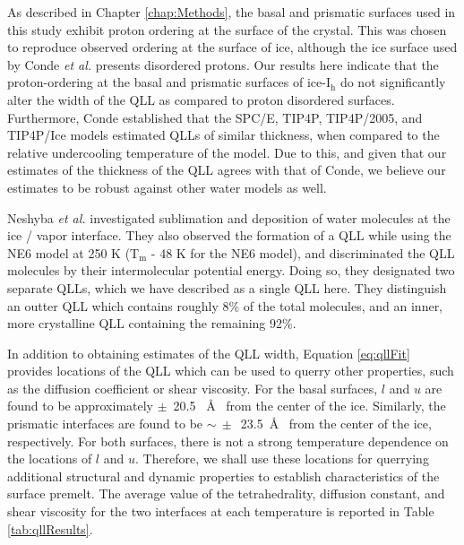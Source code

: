 As described in Chapter \ref{chap:Methods}, the basal and prismatic
surfaces used in this study exhibit proton ordering at the surface of
the crystal. This was chosen to reproduce observed ordering at the
surface of ice, although the ice surface used by Conde \textit{et al.}
presents disordered protons. Our results here indicate that the
proton-ordering at the basal and prismatic surfaces of
ice-I$_\mathrm{h}$ do not significantly alter the width of the QLL as
compared to proton disordered surfaces.  Furthermore, Conde
established that the SPC/E, TIP4P, TIP4P/2005, and TIP4P/Ice models
estimated QLLs of similar thickness, when compared to the relative
undercooling temperature of the model.\cite{Conde2008} Due to this,
and given that our estimates of the thickness of the QLL agrees with
that of Conde, we believe our estimates to be robust against other
water models as well.

Neshyba \textit{et al.} investigated sublimation and deposition of
water molecules at the ice / vapor interface.\cite{Neshyba2009} They
also observed the formation of a QLL while using the NE6
model\cite{Nada2003a} at 250 K (T$_\mathrm{m}$ - 48 K for the NE6
model), and discriminated the QLL molecules by their intermolecular
potential energy. Doing so, they designated two separate QLLs, which
we have described as a single QLL here. They distinguish an outter QLL
which contains roughly 8\% of the total molecules, and an inner, more
crystalline QLL containing the remaining 92\%. 

In addition to obtaining estimates of the QLL width, Equation
\eqref{eq:qllFit} provides locations of the QLL which can be used to
querry other properties, such as the diffusion coefficient or shear
viscosity. For the basal surfaces, $l$ and $u$ are found to be
approximately $\pm$~20.5 ~\AA~ from the center of the ice. Similarly,
the prismatic interfaces are found to be $\sim~\pm$~23.5~\AA~ from the
center of the ice, respectively. For both surfaces, there is not a
strong temperature dependence on the locations of $l$ and
$u$. Therefore, we shall use these locations for querrying additional
structural and dynamic properties to establish characteristics of the
surface premelt. The average value of the tetrahedrality, diffusion
constant, and shear viscosity for the two interfaces at each
temperature is reported in Table \ref{tab:qllResults}.

